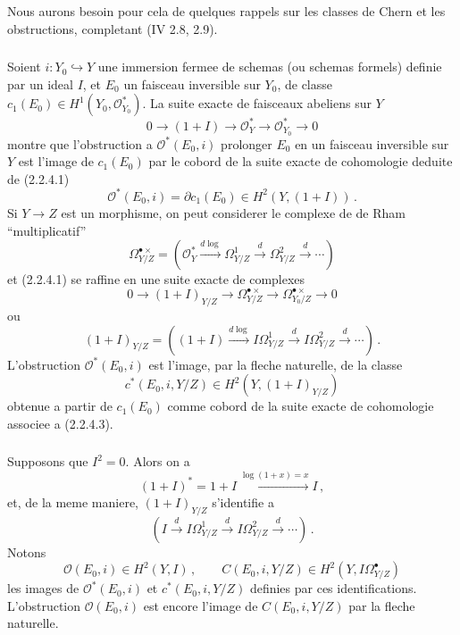 \documentclass[12pt,a4paper]{article}
\theoremstyle{plain}
\theoremstyle{definition}
\theoremstyle{remark}
\begin{document}
Nous aurons besoin pour cela de quelques rappels sur les classes de Chern et les obstructions, completant (IV 2.8, 2.9).

\subsubsection{}

Soient $i : Y_0 \hookrightarrow Y$ une immersion fermee de schemas (ou schemas formels) definie par un ideal $I$, et $E_0$ un faisceau inversible sur $Y_0$, de classe $c_1(E_0) \in H^1(Y_0, \mathcal{O}_{Y_0}^*)$. La suite exacte de faisceaux abeliens sur $Y$
\begin{equation}\label{eq:2.2.4.1}
0 \longrightarrow (1+I) \longrightarrow \mathcal{O}_Y^* \longrightarrow \mathcal{O}_{Y_0}^* \longrightarrow 0
\end{equation}
montre que l'obstruction a $\mathcal{O}^*(E_0, i)$ prolonger $E_0$ en un faisceau inversible sur $Y$ est l'image de $c_1(E_0)$ par le cobord de la suite exacte de cohomologie deduite de (2.2.4.1)
\begin{equation}\label{eq:2.2.4.2}
\mathcal{O}^*(E_0, i) = \partial c_1(E_0) \in H^2(Y, (1+I))\,.\end{equation}
Si $Y \to Z$ est un morphisme, on peut considerer le complexe de de Rham ``multiplicatif''
\[
\Omega_{Y/Z}^{\bullet\times} = (\mathcal{O}_Y^* \xrightarrow{d\log} \Omega_{Y/Z}^1 \xrightarrow{d} \Omega_{Y/Z}^2 \xrightarrow{d} \cdots)
\]
et (2.2.4.1) se raffine en une suite exacte de complexes
\begin{equation}\label{eq:2.2.4.3}
0 \longrightarrow (1+I)_{Y/Z} \longrightarrow \Omega_{Y/Z}^{\bullet\times} \longrightarrow \Omega_{Y_0/Z}^{\bullet\times} \longrightarrow 0
\end{equation}
ou
\[
(1+I)_{Y/Z} = ((1+I) \xrightarrow{d\log} I\Omega_{Y/Z}^1 \xrightarrow{d} I\Omega_{Y/Z}^2 \xrightarrow{d} \cdots)\,.\]
L'obstruction $\mathcal{O}^*(E_0, i)$ est l'image, par la fleche naturelle, de la classe
\begin{equation}\label{eq:2.2.4.4}
c^*(E_0, i, Y/Z) \in H^2(Y, (1+I)_{Y/Z})
\end{equation}
obtenue a partir de $c_1(E_0)$ comme cobord de la suite exacte de cohomologie associee a (2.2.4.3).

\subsubsection{}

Supposons que $I^2 = 0$. Alors on a
\[
(1+I)^* = 1+I \xrightarrow{\log(1+x) = x} I\,,
\]
et, de la meme maniere, $(1+I)_{Y/Z}$ s'identifie a
\[
(I \xrightarrow{d} I\Omega_{Y/Z}^1 \xrightarrow{d} I\Omega_{Y/Z}^2 \xrightarrow{d} \cdots)\,.\]
Notons
\begin{equation}\label{eq:2.2.5.1}
\mathcal{O}(E_0, i) \in H^2(Y, I)\,, \qquad C(E_0, i, Y/Z) \in H^2(Y, I\Omega_{Y/Z}^\bullet)
\end{equation}
les images de $\mathcal{O}^*(E_0, i)$ et $c^*(E_0, i, Y/Z)$ definies par ces identifications. L'obstruction $\mathcal{O}(E_0, i)$ est encore l'image de $C(E_0, i, Y/Z)$ par la fleche naturelle.
\end{document}
